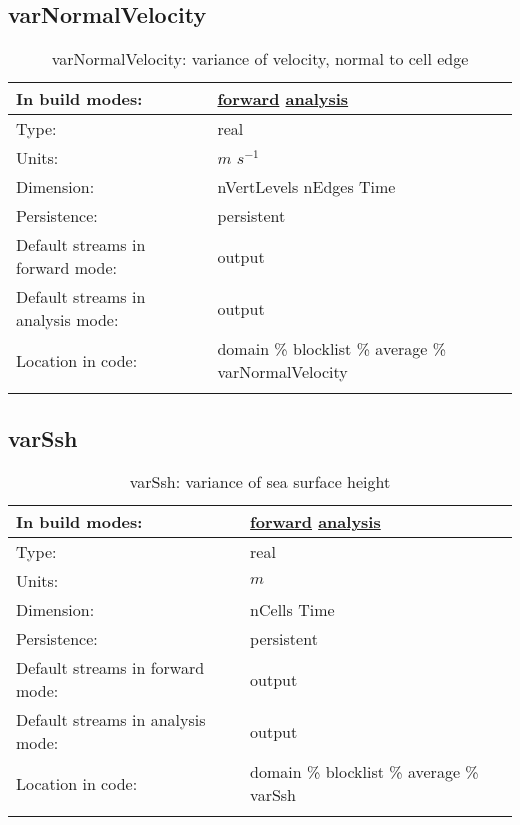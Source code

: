 \subsection[varNormalVelocity]{varNormalVelocity}
\label{subsec:var_sec_average_varNormalVelocity}
\begin{center}
\begin{longtable}{| p{2.0in} | p{4.0in} |}
        \hline 
        In build modes: & \hyperref[subsec:forward_var_tab_average]{forward} \hyperref[subsec:analysis_var_tab_average]{analysis} \\
        \hline 
        Type: & real \\
        \hline 
        Units: & $m$ $s^{-1}$ \\
        \hline 
        Dimension: & nVertLevels nEdges Time \\
        \hline 
        Persistence: & persistent \\
        \hline 
		 Default streams in forward mode: &  output \\
        \hline 
		 Default streams in analysis mode: &  output \\
        \hline 
		 Location in code: & domain \% blocklist \% average \% varNormalVelocity \\
		 \hline 
    \caption{varNormalVelocity: variance of velocity, normal to cell edge}
\end{longtable}
\end{center}
\subsection[varSsh]{varSsh}
\label{subsec:var_sec_average_varSsh}
\begin{center}
\begin{longtable}{| p{2.0in} | p{4.0in} |}
        \hline 
        In build modes: & \hyperref[subsec:forward_var_tab_average]{forward} \hyperref[subsec:analysis_var_tab_average]{analysis} \\
        \hline 
        Type: & real \\
        \hline 
        Units: & $m$ \\
        \hline 
        Dimension: & nCells Time \\
        \hline 
        Persistence: & persistent \\
        \hline 
		 Default streams in forward mode: &  output \\
        \hline 
		 Default streams in analysis mode: &  output \\
        \hline 
		 Location in code: & domain \% blocklist \% average \% varSsh \\
		 \hline 
    \caption{varSsh: variance of sea surface height}
\end{longtable}
\end{center}
